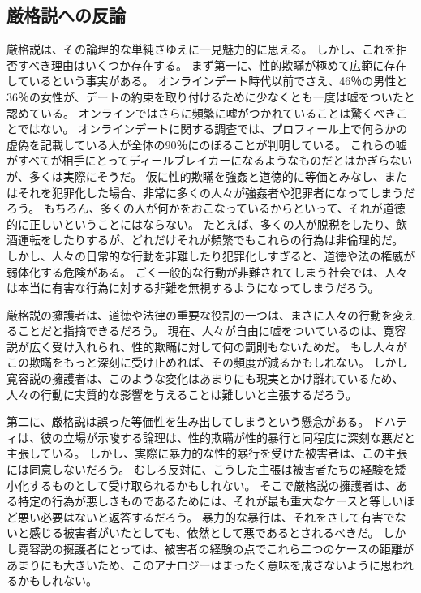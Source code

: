 \documentclass[paper=a4,book,openany]{jlreq}
\begin{document}
\subsection{厳格説への反論}

厳格説は、その論理的な単純さゆえに一見魅力的に思える。
しかし、これを拒否すべき理由はいくつか存在する。
まず第一に、性的欺瞞が極めて広範に存在しているという事実がある。
オンラインデート時代以前でさえ、46％の男性と36％の女性が、デートの約束を取り付けるために少なくとも一度は嘘をついたと認めている\citep{rowatt99:_lying_get_date}。
オンラインではさらに頻繁に嘘がつかれていることは驚くべきことではない。
オンラインデートに関する調査では、プロフィール上で何らかの虚偽を記載している人が全体の90％にのぼることが判明している\citep{hancock07:_truth_lying_onlin_datin_profil}。
これらの嘘がすべてが相手にとってディールブレイカーになるようなものだとはかぎらないが、多くは実際にそうだ。
仮に性的欺瞞を強姦と道徳的に等価とみなし、またはそれを犯罪化した場合、非常に多くの人々が強姦者や犯罪者になってしまうだろう。
もちろん、多くの人が何かをおこなっているからといって、それが道徳的に正しいということにはならない。
たとえば、多くの人が脱税をしたり、飲酒運転をしたりするが、どれだけそれが頻繁でもこれらの行為は非倫理的だ。
しかし、人々の日常的な行動を非難したり犯罪化しすぎると、道徳や法の権威が弱体化する危険がある。
ごく一般的な行動が非難されてしまう社会では、人々は本当に有害な行為に対する非難を無視するようになってしまうだろう。

厳格説の擁護者は、道徳や法律の重要な役割の一つは、まさに人々の行動を変えることだと指摘できるだろう。
現在、人々が自由に嘘をついているのは、寛容説が広く受け入れられ、性的欺瞞に対して何の罰則もないためだ。
もし人々がこの欺瞞をもっと深刻に受け止めれば、その頻度が減るかもしれない。
しかし寛容説の擁護者は、このような変化はあまりにも現実とかけ離れているため、人々の行動に実質的な影響を与えることは難しいと主張するだろう。

第二に、厳格説は誤った等価性を生み出してしまうという懸念がある。
ドハティは、彼の立場が示唆する論理は、性的欺瞞が性的暴行と同程度に深刻な悪だと主張している。
しかし、実際に暴力的な性的暴行を受けた被害者は、この主張には同意しないだろう。
むしろ反対に、こうした主張は被害者たちの経験を矮小化するものとして受け取られるかもしれない。
そこで厳格説の擁護者は、ある特定の行為が悪しきものであるためには、それが最も重大なケースと等しいほど悪い必要はないと返答するだろう。
暴力的な暴行は、それをさして有害でないと感じる被害者がいたとしても、依然として悪であるとされるべきだ。
しかし寛容説の擁護者にとっては、被害者の経験の点でこれら二つのケースの距離があまりにも大きいため、このアナロジーはまったく意味を成さないように思われるかもしれない。
\end{document}

